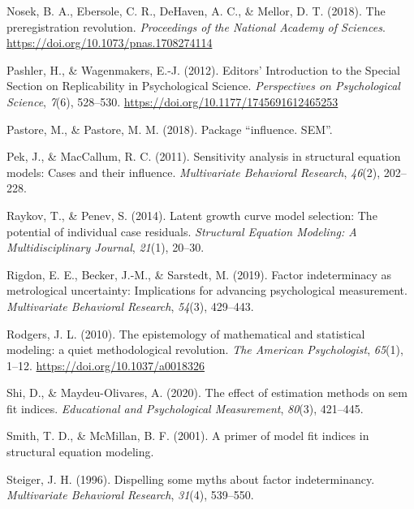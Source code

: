 \documentclass[
  english,
  doc]{apa6}
\newlength{\cslhangindent}
\newenvironment{cslreferences}%
  {\setlength{\parindent}{0pt}%
  \everypar{\setlength{\hangindent}{\cslhangindent}}\ignorespaces}%
  {\par}
\begin{document}
\begin{cslreferences}
\leavevmode\hypertarget{ref-Nosek2018}{}%
Nosek, B. A., Ebersole, C. R., DeHaven, A. C., \& Mellor, D. T. (2018). The preregistration revolution. \emph{Proceedings of the National Academy of Sciences}. \url{https://doi.org/10.1073/pnas.1708274114}

\leavevmode\hypertarget{ref-Pashler2012a}{}%
Pashler, H., \& Wagenmakers, E.-J. (2012). Editors' Introduction to the Special Section on Replicability in Psychological Science. \emph{Perspectives on Psychological Science}, \emph{7}(6), 528--530. \url{https://doi.org/10.1177/1745691612465253}

\leavevmode\hypertarget{ref-pastore2018package}{}%
Pastore, M., \& Pastore, M. M. (2018). Package ``influence. SEM''.

\leavevmode\hypertarget{ref-pek2011sensitivity}{}%
Pek, J., \& MacCallum, R. C. (2011). Sensitivity analysis in structural equation models: Cases and their influence. \emph{Multivariate Behavioral Research}, \emph{46}(2), 202--228.

\leavevmode\hypertarget{ref-raykov2014latent}{}%
Raykov, T., \& Penev, S. (2014). Latent growth curve model selection: The potential of individual case residuals. \emph{Structural Equation Modeling: A Multidisciplinary Journal}, \emph{21}(1), 20--30.

\leavevmode\hypertarget{ref-rigdon2019factor}{}%
Rigdon, E. E., Becker, J.-M., \& Sarstedt, M. (2019). Factor indeterminacy as metrological uncertainty: Implications for advancing psychological measurement. \emph{Multivariate Behavioral Research}, \emph{54}(3), 429--443.

\leavevmode\hypertarget{ref-rodgers_epistemology_2010}{}%
Rodgers, J. L. (2010). The epistemology of mathematical and statistical modeling: a quiet methodological revolution. \emph{The American Psychologist}, \emph{65}(1), 1--12. \url{https://doi.org/10.1037/a0018326}

\leavevmode\hypertarget{ref-shi2020effect}{}%
Shi, D., \& Maydeu-Olivares, A. (2020). The effect of estimation methods on sem fit indices. \emph{Educational and Psychological Measurement}, \emph{80}(3), 421--445.

\leavevmode\hypertarget{ref-smith2001primer}{}%
Smith, T. D., \& McMillan, B. F. (2001). A primer of model fit indices in structural equation modeling.

\leavevmode\hypertarget{ref-steiger1996dispelling}{}%
Steiger, J. H. (1996). Dispelling some myths about factor indeterminancy. \emph{Multivariate Behavioral Research}, \emph{31}(4), 539--550.


\end{cslreferences}
\end{document}
